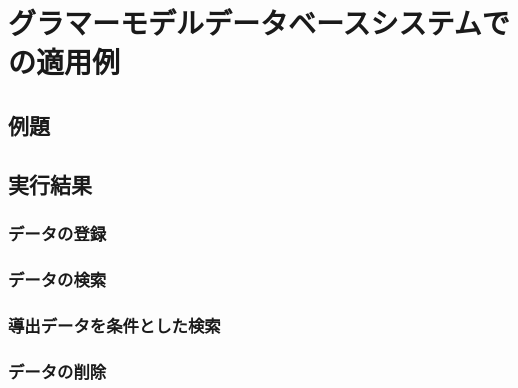 \chapter{グラマーモデルデータベースシステムでの適用例}
\thispagestyle{myheadings}

\section{例題}

\section{実行結果}

\subsection{データの登録}

\subsection{データの検索}

\subsection{導出データを条件とした検索}

\subsection{データの削除}

